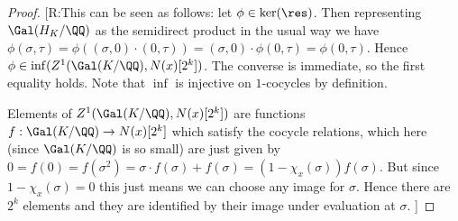 \documentclass{lecturenotes}
\newcommand{\ross}[1]{{\color{red}[R:#1]}}
\numberwithin{equation}{section}
\begin{document}
\begin{proof}
    \ross{This can be seen as follows: let $\phi\in\ker(\res)$.  Then representing $\gal(H_K/\QQ)$ as the semidirect product in the usual way we have $\phi(\sigma,\tau)=\phi((\sigma,0)\cdot(0,\tau))=(\sigma,0)\cdot\phi(0,\tau)=\phi(0,\tau)$.  Hence $\phi\in \inf(Z^1(\gal(K/\QQ), N(x)[2^k])$.  The converse is immediate, so the first equality holds.  Note that $\inf$ is injective on $1$-cocycles by definition.

    Elements of $Z^1(\Gal(K/\QQ), N(x)[2^k])$ are functions $f:\Gal(K/\QQ)\to N(x)[2^k]$ which satisfy the cocycle relations, which here (since $\Gal(K/\QQ)$ is so small) are just given by $0=f(0)=f(\sigma^2)=\sigma\cdot f(\sigma)+f(\sigma)=(1-\chi_x(\sigma))f(\sigma)$.  But since $1-\chi_x(\sigma)=0$ this just means we can choose any image for $\sigma$.  Hence there are $2^k$ elements and they are identified by their image under evaluation at $\sigma$.
    }
\end{proof}
\end{document}
